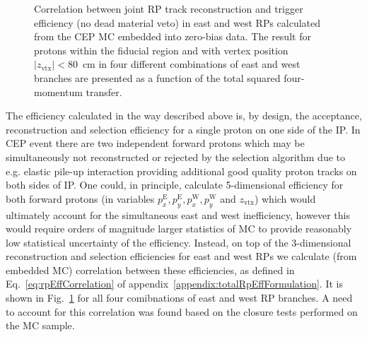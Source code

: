 \begin{figure}[ht!]
\begin{minipage}{.4725\textwidth}
  \caption{Correlation between joint RP track reconstruction and trigger efficiency (no dead material veto) in east and west RPs calculated from the CEP MC embedded into zero-bias data. The result for protons within the fiducial region and with vertex position $|z_{\text{vtx}}|<80$~cm in four different combinations of east and west branches are presented as a function of the total squared four-momentum transfer.}\label{fig:SimultaneousEastWestRpTrackLoss}
\end{minipage}%
\end{figure}%


The efficiency calculated in the way described above is, by design, the acceptance, reconstruction and selection efficiency for a single proton on one side of the IP. In CEP event there are two independent forward protons which may be simultaneously not reconstructed or rejected by the selection algorithm due to e.g. elastic pile-up interaction providing additional good quality proton tracks on both sides of IP. One could, in principle, calculate 5-dimensional efficiency for both forward protons (in variables $p_{x}^{\text{E}}, p_{y}^{\text{E}}, p_{x}^{\text{W}}, p_{y}^{\text{W}}$ and $z_{\text{vtx}}$) which would ultimately account for the simultaneous east and west inefficiency, however this would require orders of magnitude larger statistics of MC to provide reasonably low statistical uncertainty of the efficiency. Instead, on top of the 3-dimensional reconstruction and selection efficiencies for east and west RPs we calculate (from embedded MC) correlation between these efficiencies, as defined in Eq.~\eqref{eq:rpEffCorrelation} of appendix~\ref{appendix:totalRpEffFormulation}. It is shown in 
Fig.~\ref{fig:SimultaneousEastWestRpTrackLoss} for all four comibnations of east and west RP branches. A need to account for this correlation was found based on the closure tests performed on the MC sample.





